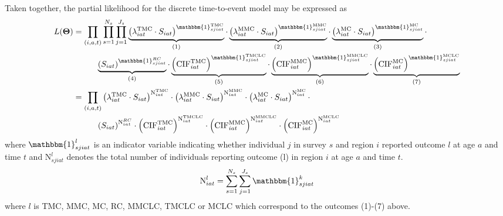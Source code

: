 \documentclass{article}
\begin{document}
\begin{appendix}
\noindent Taken together, the partial likelihood for the discrete time-to-event model may be expressed as 
\begin{eqnarray*}
	L(\boldsymbol{\Theta}) &= \displaystyle\prod_{(i,a,t)} \prod_{s=1}^{N_s} \prod_{j=1}^{J_s}  \underbrace{\left(\lambda^{\text{TMC}}_{iat}\cdot S_{iat}\right)^{\mathbbm{1}^{\text{TMC}}_{sjiat}}}_{\text{(1)}} \cdot  \underbrace{ \left(\lambda^{\text{MMC}}_{iat} \cdot S_{iat}\right)^{\mathbbm{1}^\text{MMC}_{sjiat}}}_{\text{(2)}} \cdot\underbrace{\left(\lambda^{\text{MC}}_{iat} \cdot S_{iat}\right)^{\mathbbm{1}^\text{MC}_{sjiat}}}_{\text{(3)}} \cdot \\
 & \hspace{1cm}  \underbrace{\left(S_{iat}\right)^{\mathbbm{1}^{RC}_{sjiat}}}_{\text{(4)}} \cdot \underbrace{\left(\text{CIF}^{\text{TMC}}_{iat}\right)^{\mathbbm{1}^{\text{TMCLC}}_{sjiat}}}_{\text{(5)}} \cdot \underbrace{\left(\text{CIF}^{\text{MMC}}_{iat}\right)^{\mathbbm{1}^{\text{MMCLC}}_{sjiat}}}_{\text{(6)}} \cdot \underbrace{\left(\text{CIF}^{\text{MC}}_{iat}\right)^{\mathbbm{1}^{\text{MCLC}}_{sjiat}}}_{\text{(7)}} \\
	   &= \displaystyle\prod_{(i,a,t)} 
    \left(\lambda^{\text{TMC}}_{iat}\cdot S_{iat}\right)^{\text{N}^{\text{TMC}}_{iat}} \cdot  
    \left(\lambda^{\text{MMC}}_{iat} \cdot S_{iat}\right)^{\text{N}^\text{MMC}_{iat}} \cdot 
    \left(\lambda^{\text{MC}}_{iat} \cdot S_{iat}\right)^{\text{N}^\text{MC}_{iat}}  \cdot \\ & \hspace{1cm}  \left(S_{iat}\right)^{\text{N}^{RC}_{iat}} \cdot \left(\text{CIF}^{\text{TMC}}_{iat}\right)^{\text{N}^{\text{TMCLC}}_{iat}} \cdot \left(\text{CIF}^{\text{MMC}}_{iat}\right)^{\text{N}^{\text{MMCLC}}_{iat}}\cdot 
    \left(\text{CIF}^{\text{MC}}_{iat}\right)^{\text{N}^{\text{MCLC}}_{iat}}
\end{eqnarray*}
where $\mathbbm{1}^{l}_{sjiat}$ is an indicator variable indicating whether individual $j$ in survey $s$ and region $i$ reported outcome $l$ at age $a$ and time $t$ and $\text{N}^{l}_{sjiat}$ denotes the total number of individuals reporting outcome (l) in region $i$ at age $a$ and time $t$.
\begin{equation*}
	\text{N}^{l}_{iat} = \sum_{s=1}^{N_s}\sum_{j=1}^{J_s} \mathbbm{1}^k_{sjiat}
\end{equation*}
where $l$ is TMC, MMC, MC, RC, MMCLC, TMCLC or MCLC which correspond to the outcomes (1)-(7) above.



\end{appendix}
\end{document}
